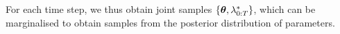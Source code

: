 \documentclass[../main.tex]{subfiles}
\begin{document}
For each time step, we thus obtain joint samples $\left\{  \bm{\theta}, \lambda_{0:T}^* \right\}$, which can be marginalised to obtain samples from the posterior distribution of parameters. 


%
%		
%	
%	
%	
%	
%	
%	
%	
\end{document}
